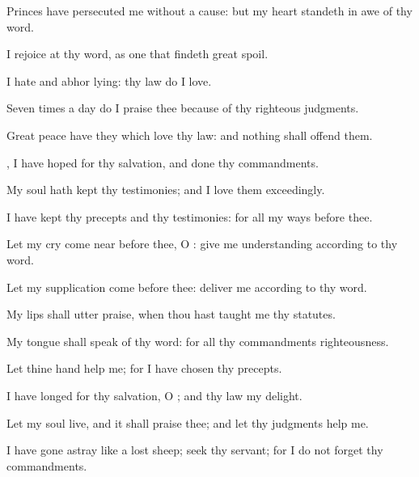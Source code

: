 {\Q {}Princes have
persecuted me without a
cause: but my
heart standeth in
awe of thy
word.


\par }{\Q {}I
rejoice at thy
word, as one that
findeth
great
spoil.


\par }{\Q {}I
hate and
abhor
lying:
{} thy
law do I
love.


\par }{\Q {}Seven
times a
day do I
praise thee because of thy
righteous
judgments.


\par }{\Q {}Great
peace have they which
love thy
law: and nothing shall
offend them.


\par }{\Q {}, I have
hoped for thy
salvation, and
done thy
commandments.


\par }{\BB \par }
{\Q {}My
soul hath
kept thy
testimonies; and I
love them
exceedingly.


\par }{\Q {}I have
kept thy
precepts and thy
testimonies: for all my
ways
{} before thee.


\par }{\BB \par }
{
\par }
{\Q {}Let my
cry come
near
before thee, O
{}: give me
understanding according to thy
word.


\par }{\Q {}Let my
supplication
come
before thee:
deliver me according to thy
word.


\par }{\Q {}My
lips shall
utter
praise, when thou hast
taught me thy
statutes.


\par }{\Q {}My
tongue shall
speak of thy
word: for all thy
commandments
{}
righteousness.


\par }{\BB \par }
{\Q {}Let thine
hand
help me; for I have
chosen thy
precepts.


\par }{\Q {}I have
longed for thy
salvation, O
{}; and thy
law
{} my
delight.


\par }{\Q {}Let my
soul
live, and it shall
praise thee; and let thy
judgments
help me.


\par }{\Q {}I have gone
astray like a
lost
sheep;
seek thy
servant; for I do not
forget thy
commandments.




\par }
